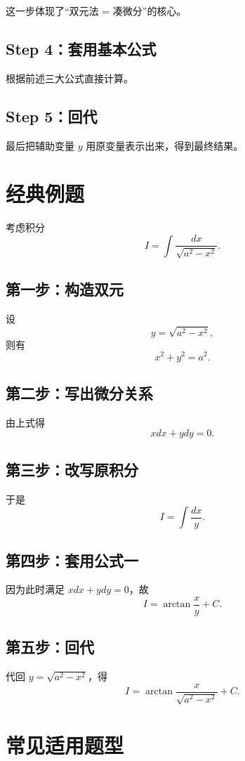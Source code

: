 \documentclass[UTF8,a4paper,12pt]{ctexart}
\begin{document}
这一步体现了“双元法 = 凑微分”的核心。

\subsection{Step 4：套用基本公式}

根据前述三大公式直接计算。

\subsection{Step 5：回代}

最后把辅助变量 $y$ 用原变量表示出来，得到最终结果。

\section{经典例题}

考虑积分
\[
  I=\int \frac{dx}{\sqrt{a^2-x^2}}.
\]

\subsection*{第一步：构造双元}
设
\[
  y=\sqrt{a^2-x^2},
\]
则有
\[
  x^2+y^2=a^2.
\]

\subsection*{第二步：写出微分关系}
由上式得
\[
  xdx+ydy=0.
\]

\subsection*{第三步：改写原积分}
于是
\[
  I=\int \frac{dx}{y}.
\]

\subsection*{第四步：套用公式一}
因为此时满足 $xdx+ydy=0$，故
\[
  I=\arctan\frac{x}{y}+C.
\]

\subsection*{第五步：回代}
代回 $y=\sqrt{a^2-x^2}$，得
\[
  I=\arctan\frac{x}{\sqrt{a^2-x^2}}+C.
\]

\section{常见适用题型}
\end{document}
